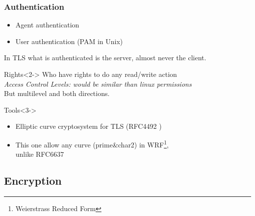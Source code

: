 \documentclass{beamer}
\begin{document}
\begin{frame}
\frametitle{Authentication}
    \begin{block}{}
        \begin{itemize}
            \item Agent authentication
            \item User authentication (PAM in Unix)
        \end{itemize}
        In TLS what is authenticated is the server, almost never the client.
    \end{block}
    \begin{block}{Rights}<2->
         Who have rights to do any read/write action\\
         \emph{Access Control Levels: would be similar than linux permissions}\\
         But multilevel and both directions.
    \end{block}
    \begin{alertblock}{Tools}<3->
        \begin{itemize}
            \item Elliptic curve cryptosystem for TLS (RFC4492 \cite{rfc4492})
            \item This one allow any curve (prime\&char2) in WRF\footnote{Weierstrass Reduced Form},\\unlike RFC6637 \cite{rfc6637}
        \end{itemize}
    \end{alertblock}
\end{frame}

\subsection{Encryption}
\end{document}
